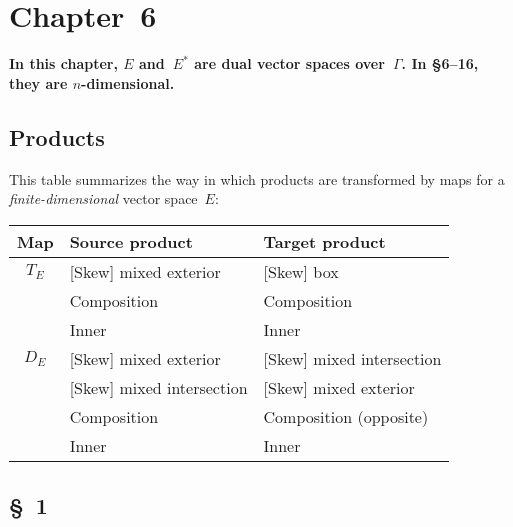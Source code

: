 \documentclass[letterpaper,12pt]{article}
\theoremstyle{definition}
\theoremstyle{remark}
\begin{document}
\newpage
\section*{Chapter~6}
{\boldmath\textbf{In this chapter, \(E\) and~\(E^*\) are dual vector spaces over~\(\Gamma\). In \S6--16, they are \(n\)-dimensional.}}

\subsection*{Products}
\noindent This table summarizes the way in which products are transformed by maps for a \emph{finite-dimensional} vector space~\(E\):
\begin{center}
\begin{tabular}{|c|l|l|}
\hline
\textbf{Map}&\textbf{Source product}&\textbf{Target product}\\
\hline
\(T_E\)&[Skew] mixed exterior&[Skew] box\\
	&Composition&Composition\\
	&Inner&Inner\\
\hline
\(D_E\)&[Skew] mixed exterior&[Skew] mixed intersection\\
	&[Skew] mixed intersection&[Skew] mixed exterior\\
	&Composition&Composition (opposite)\\
	&Inner&Inner\\
\hline
\end{tabular}
\end{center}

\subsection*{\S~1}
\end{document}
